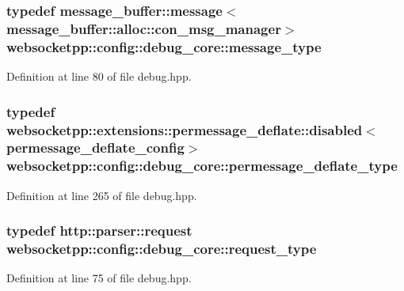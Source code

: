 \subsubsection[{message\+\_\+type}]{\setlength{\rightskip}{0pt plus 5cm}typedef {\bf message\+\_\+buffer\+::message}$<${\bf message\+\_\+buffer\+::alloc\+::con\+\_\+msg\+\_\+manager}$>$ {\bf websocketpp\+::config\+::debug\+\_\+core\+::message\+\_\+type}}\label{structwebsocketpp_1_1config_1_1debug__core_ac17c81ad59c265eed87e3e25944c9fbf}


Definition at line 80 of file debug.\+hpp.

\hypertarget{structwebsocketpp_1_1config_1_1debug__core_a7fc8d2b3ac3f07c03b7e912524a944df}{}
\subsubsection[{permessage\+\_\+deflate\+\_\+type}]{\setlength{\rightskip}{0pt plus 5cm}typedef {\bf websocketpp\+::extensions\+::permessage\+\_\+deflate\+::disabled}$<${\bf permessage\+\_\+deflate\+\_\+config}$>$ {\bf websocketpp\+::config\+::debug\+\_\+core\+::permessage\+\_\+deflate\+\_\+type}}\label{structwebsocketpp_1_1config_1_1debug__core_a7fc8d2b3ac3f07c03b7e912524a944df}


Definition at line 265 of file debug.\+hpp.

\hypertarget{structwebsocketpp_1_1config_1_1debug__core_a597de872d5a5b6e9bd2fa1af18ccbbc6}{}
\subsubsection[{request\+\_\+type}]{\setlength{\rightskip}{0pt plus 5cm}typedef {\bf http\+::parser\+::request} {\bf websocketpp\+::config\+::debug\+\_\+core\+::request\+\_\+type}}\label{structwebsocketpp_1_1config_1_1debug__core_a597de872d5a5b6e9bd2fa1af18ccbbc6}


Definition at line 75 of file debug.\+hpp.


